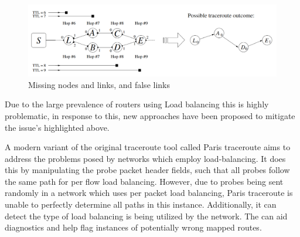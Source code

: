 \begin{figure}[!ht]
  \begin{center}
    \includegraphics[scale=0.3]{images/missing_nodes.png}
    \caption{Missing nodes and links, and false links \cite{anomalies}}
    \label{figure:missing_node_fig}
  \end{center}
\end{figure}


Due to the large prevalence of routers using Load balancing this is highly problematic, in response to this, new approaches have been proposed to mitigate the issue's highlighted above.


A modern variant of the original traceroute tool called Paris traceroute aims to address the problems posed by networks which employ load-balancing. It does this by manipulating the probe packet header fields, such that all probes follow the same path for per flow load balancing. However, due to probes being sent randomly in a network which uses per packet load balancing, Paris traceroute is unable to perfectly determine all paths in this instance. 
Additionally, it can detect the type of load balancing is being utilized by the network. The can aid diagnostics and help flag instances of potentially wrong mapped routes. \cite{anomalies}

